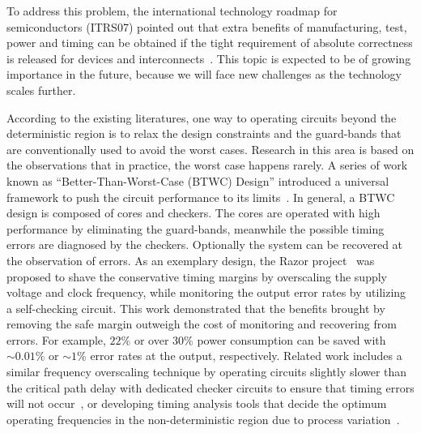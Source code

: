 \documentclass[journal]{IEEEtran}
\begin{document}

To address this problem, the international technology roadmap for semiconductors (ITRS07) pointed out that extra benefits of manufacturing, test, power and timing can be obtained if the tight requirement of absolute correctness is released for devices and interconnects~\cite{semiconductor2007international}. This topic is expected to be of growing importance in the future, because we will face new challenges as the technology scales further.

According to the existing literatures, one way to operating circuits beyond the deterministic region is to relax the design constraints and the guard-bands that are conventionally used to avoid the worst cases. Research in this area is based on the observations that in practice, the worst case happens rarely. A series of work known as ``Better-Than-Worst-Case (BTWC) Design'' introduced a universal framework to push the circuit performance to its limits~\cite{BetterThanWS2005}. In general, a BTWC design is composed of cores and checkers. The cores are operated with high performance by eliminating the guard-bands, meanwhile the possible timing errors are diagnosed by the checkers. Optionally the system can be recovered at the observation of errors. As an exemplary design, the Razor project~\cite{Razor2003,Razor2004} was proposed to shave the conservative timing margins by overscaling the supply voltage and clock frequency, while monitoring the output error rates by utilizing a self-checking circuit. This work demonstrated that the benefits brought by removing the safe margin outweigh the cost of monitoring and recovering from errors. For example, $22\%$ or over $30\%$ power consumption can be saved with $\sim0.01\%$ or $\sim1\%$ error rates at the output, respectively. Related work includes a similar frequency overscaling technique by operating circuits slightly slower than the critical path delay with dedicated checker circuits to ensure that timing errors will not occur~\cite{TEAtime2004}, or developing timing analysis tools that decide the optimum operating frequencies in the non-deterministic region due to process variation~\cite{ProbabilisticSTA}.
\end{document}
